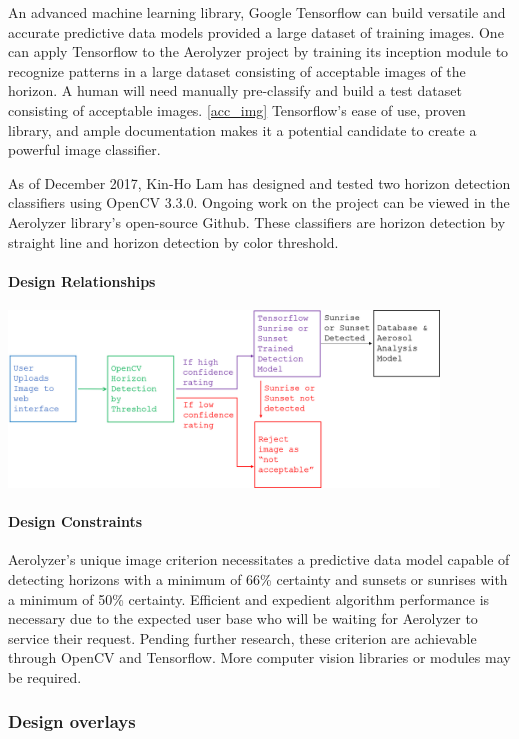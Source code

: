 \documentclass[onecolumn, draftclsnofoot,10pt, compsoc]{IEEEtran}
\begin{document}
\begin{singlespace}
				An advanced machine learning library, Google Tensorflow can build versatile and accurate predictive data models provided a large dataset of training images. One can apply Tensorflow to the Aerolyzer project by training its inception module to recognize patterns in a large dataset consisting of acceptable images of the horizon. A human will need manually pre-classify and build a test dataset consisting of acceptable images. \ref{acc_img}  Tensorflow’s ease of use, proven library, and ample documentation makes it a potential candidate to create a powerful image classifier. \cite{rhnvrm} \cite{RNN}

				As of December 2017, Kin-Ho Lam has designed and tested two horizon detection classifiers using OpenCV 3.3.0. Ongoing work on the project can be viewed in the Aerolyzer library’s open-source Github. These classifiers are horizon detection by straight line and horizon detection by color threshold.

          \paragraph{Design Relationships}
          		\includegraphics[width=4.5in,natwidth=1907,natheight=787]{images/tensor.png}

          \paragraph{Design Constraints}
          		Aerolyzer’s unique image criterion necessitates a predictive data model capable of detecting horizons with a minimum of 66\% certainty and sunsets or sunrises with a minimum of 50\% certainty. Efficient and expedient algorithm performance is necessary due to the expected user base who will be waiting for Aerolyzer to service their request. Pending further research, these criterion are achievable through OpenCV and Tensorflow. More computer vision libraries or modules may be required.
      
      \subsubsection{Design overlays}

\end{singlespace}
\end{document}
